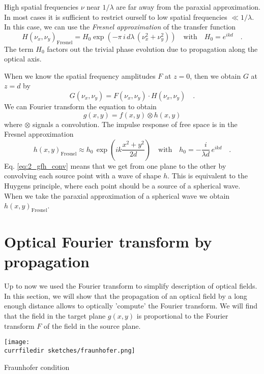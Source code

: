 High spatial frequencies $\nu$ near $1/\lambda$ are far away from the paraxial approximation. In most cases it is sufficient to restrict ourself to low spatial frequencies $ \ll 1/\lambda$. In this case, we can use the \emph{Fresnel approximation} of the transfer function
\begin{equation}
    H(\nu_x, \nu_y)_\text{Fresnel} = H_0 \exp \left(  
   -  \pi \, i  \, d \lambda \, (
 \nu_x^2 + \nu_y^2 )
    \right) \quad \text{with} \quad H_0 = e^{i k d} \quad .
\end{equation}
The term $H_0$ factors out the trivial phase evolution due to propagation along the optical axis.

When we know the spatial frequency amplitudes $F$ at $z=0$, then we obtain $G$ at $z=d$ by
\begin{equation}
    G(\nu_x, \nu_y) =  F(\nu_x, \nu_y) \cdot  H(\nu_x, \nu_y) \quad .
\end{equation}
We can Fourier transform the equation to obtain 
\begin{equation}
    g(x,y) = f(x,y) \otimes h(x,y) \label{eq:2_gfh_conv}
\end{equation}
where $\otimes$ signals a convolution. The impulse response of free space is in the Fresnel approximation
\begin{equation}
    h(x,y)_\text{Fresnel} \approx h_0 \, \exp \left(i k \frac{x^2 + y^2 }{2d} \right) \quad \text{with} \quad
    h_0 = -\frac{i}{\lambda d} \,  e^{i k d } \quad .
\end{equation}
Eq. \ref{eq:2_gfh_conv} means that we get from one plane to the other by convolving each source point with a wave of shape $h$. This is equivalent to the Huygens principle, where each point should be a source of a spherical wave. When we take the paraxial approximation of a spherical wave we obtain $ h(x,y)_\text{Fresnel}$.


\section{Optical Fourier transform by propagation}

Up to now we used the Fourier transform to simplify description of optical fields. In this section, we will show that the propagation of an optical field by a long enough distance allows to optically 'compute' the Fourier transform. We will find that the field in the target plane $g(x,y)$ is proportional to the Fourier transform $F$ of the field in the source plane.

\begin{marginfigure}
    \texttt{[image: \\currfiledir sketches/fraunhofer.png]}
    \caption{Fraunhofer condition}
\end{marginfigure}

